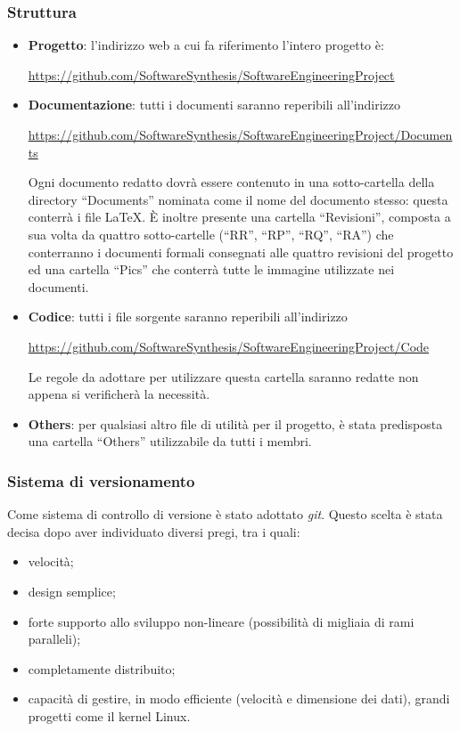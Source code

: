 \subsubsection{Struttura}
\label{sec:struttura}
\begin{itemize}
\item \textbf{Progetto}: l'indirizzo web a cui fa riferimento l'intero progetto è: 
\begin{center}
\url{https://github.com/SoftwareSynthesis/SoftwareEngineeringProject}
\end{center} 
\item \textbf{Documentazione}: tutti i documenti saranno reperibili all'indirizzo
\begin{center}
\url{https://github.com/SoftwareSynthesis/SoftwareEngineeringProject/Documents}
\end{center}
Ogni documento redatto dovrà essere contenuto in una sotto-cartella della directory ``Documents'' nominata come il nome del documento stesso: questa conterrà i file \LaTeX. È inoltre presente una cartella ``Revisioni'', composta a sua volta da quattro sotto-cartelle (``RR'', ``RP'', ``RQ'', ``RA'') che conterranno i documenti formali consegnati alle quattro revisioni del progetto ed una cartella ``Pics'' che conterrà tutte le immagine utilizzate nei documenti.
\item \textbf{Codice}: tutti i file sorgente saranno reperibili all'indirizzo
\begin{center}
\url{https://github.com/SoftwareSynthesis/SoftwareEngineeringProject/Code}
\end{center}
Le regole da adottare per utilizzare questa cartella saranno redatte non appena si verificherà la necessità.
\item \textbf{Others}: per qualsiasi altro file di utilità per il progetto, è stata predisposta una cartella ``Others'' utilizzabile da tutti i membri.
\end{itemize}

\subsubsection{Sistema di versionamento}
Come sistema di controllo di versione  è stato adottato \textit{git}. Questo scelta è stata decisa dopo aver individuato diversi pregi, tra i quali:
\begin{itemize}
\item velocità;
\item design semplice;
\item forte supporto allo sviluppo non-lineare (possibilità di migliaia di rami paralleli);
\item completamente distribuito;
\item capacità di gestire, in modo efficiente (velocità e dimensione dei dati), grandi progetti come il kernel Linux.
\end{itemize}

